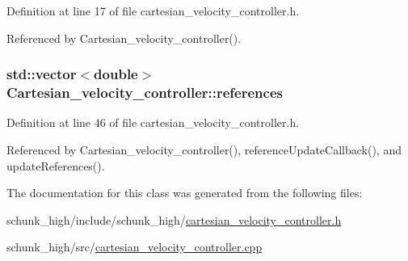 Definition at line 17 of file cartesian\-\_\-velocity\-\_\-controller.\-h.



Referenced by Cartesian\-\_\-velocity\-\_\-controller().

\hypertarget{classCartesian__velocity__controller_afc3792f1f6dd0025417d752a89e519e1}{
\subsubsection[{references}]{\setlength{\rightskip}{0pt plus 5cm}std\-::vector$<$double$>$ Cartesian\-\_\-velocity\-\_\-controller\-::references}}\label{classCartesian__velocity__controller_afc3792f1f6dd0025417d752a89e519e1}


Definition at line 46 of file cartesian\-\_\-velocity\-\_\-controller.\-h.



Referenced by Cartesian\-\_\-velocity\-\_\-controller(), reference\-Update\-Callback(), and update\-References().



The documentation for this class was generated from the following files\-:\begin{DoxyCompactItemize}
\item 
schunk\-\_\-high/include/schunk\-\_\-high/\hyperlink{cartesian__velocity__controller_8h}{cartesian\-\_\-velocity\-\_\-controller.\-h}\item 
schunk\-\_\-high/src/\hyperlink{cartesian__velocity__controller_8cpp}{cartesian\-\_\-velocity\-\_\-controller.\-cpp}\end{DoxyCompactItemize}
